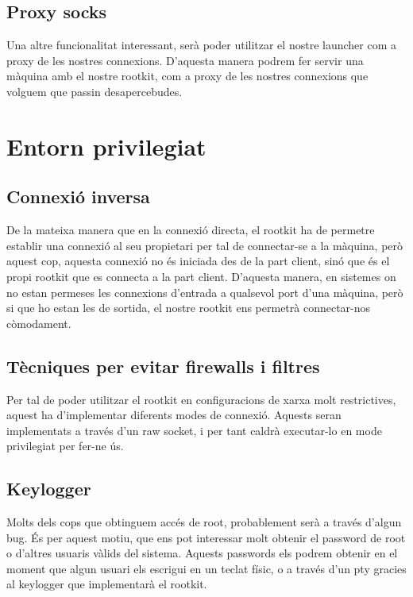 \subsection{Proxy socks}
Una altre funcionalitat interessant, serà poder utilitzar el nostre launcher com a proxy de les nostres connexions. D'aquesta manera
podrem fer servir una màquina amb el nostre rootkit, com a proxy de les nostres connexions que volguem que passin desapercebudes.

\section{Entorn privilegiat}

\subsection{Connexió inversa}
De la mateixa manera que en la connexió directa, el rootkit ha de permetre establir una connexió al seu propietari per tal de connectar-se
a la màquina, però aquest cop, aquesta connexió no és iniciada des de la part client, sinó que és el propi rootkit que es connecta 
a la part client. D'aquesta manera, en sistemes on no estan permeses les connexions d'entrada a qualsevol port d'una màquina, però si
que ho estan les de sortida, el nostre rootkit ens permetrà connectar-nos còmodament.

\subsection{Tècniques per evitar firewalls i filtres}
Per tal de poder utilitzar el rootkit en configuracions de xarxa molt restrictives, aquest ha d'implementar diferents modes de connexió.
Aquests seran implementats a través d'un raw socket, i per tant caldrà executar-lo en mode privilegiat per fer-ne ús.

\subsection{Keylogger}
Molts dels cops que obtinguem accés de root, probablement serà a través d'algun bug. És per aquest motiu, que ens pot interessar molt
obtenir el password de root o d'altres usuaris vàlids del sistema. Aquests passwords els podrem obtenir en el moment que algun usuari
els escrigui en un teclat físic, o a través d'un pty gracies al keylogger que implementarà el rootkit.

